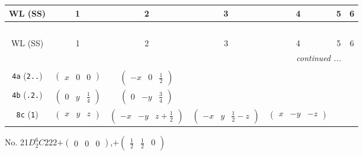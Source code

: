 \documentclass[fleqn,9pt,landscape]{jsarticle}
\begin{document}
\begin{center}
\renewcommand{\arraystretch}{1.2}
\begin{longtable}{ccccccc}
 \hline \hline
WL (SS) & 1 & 2 & 3 & 4 & 5 & 6 \\ \hline \endfirsthead

\multicolumn{6}{l}{\tablename\ \thetable{}} \\
 \hline \hline
WL (SS) & 1 & 2 & 3 & 4 & 5 & 6 \\ \hline \endhead

 \hline \hline
\multicolumn{6}{r}{\footnotesize\it continued ...} \\ \endfoot

 \hline \hline
\multicolumn{6}{r}{} \\ \endlastfoot

{\tt 4a} ({\tt 2..}) & $ \begin{pmatrix} x & 0 & 0 \end{pmatrix} $ & $ \begin{pmatrix} - x & 0 & \frac{1}{2} \end{pmatrix} $ & $  $ & $  $ \\ \hline
{\tt 4b} ({\tt .2.}) & $ \begin{pmatrix} 0 & y & \frac{1}{4} \end{pmatrix} $ & $ \begin{pmatrix} 0 & - y & \frac{3}{4} \end{pmatrix} $ & $  $ & $  $ \\ \hline
{\tt 8c} ({\tt 1}) & $ \begin{pmatrix} x & y & z \end{pmatrix} $ & $ \begin{pmatrix} - x & - y & z + \frac{1}{2} \end{pmatrix} $ & $ \begin{pmatrix} - x & y & \frac{1}{2} - z \end{pmatrix} $ & $ \begin{pmatrix} x & - y & - z \end{pmatrix} $ \\
\end{longtable}
\end{center}
\newpage
No. 21\quad$D_{2}^{6}$\quad$C222$\quad[ orthorhombic ]\quad$+\begin{pmatrix} 0 & 0 & 0 \end{pmatrix}$,\quad $+\begin{pmatrix} \frac{1}{2} & \frac{1}{2} & 0 \end{pmatrix}$
\end{document}
